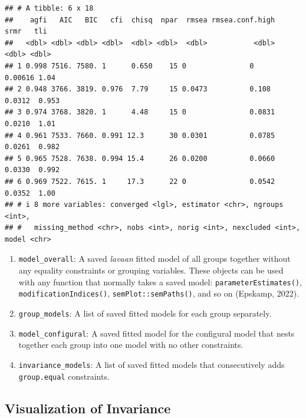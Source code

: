 \documentclass[
  man]{apa7}
\newenvironment{Shaded}{\begin{snugshade}}{\end{snugshade}}
\newcommand{\FunctionTok}[1]{\textcolor[rgb]{0.13,0.29,0.53}{\textbf{#1}}}
\newcommand{\NormalTok}[1]{#1}
\newcommand{\SpecialCharTok}[1]{\textcolor[rgb]{0.81,0.36,0.00}{\textbf{#1}}}
\providecommand{\tightlist}{%
  \setlength{\itemsep}{0pt}\setlength{\parskip}{0pt}}
\begin{document}
\small

\begin{Shaded}
\end{Shaded}

\normalsize

\begin{verbatim}
## # A tibble: 6 x 18
##    agfi   AIC   BIC   cfi  chisq  npar  rmsea rmsea.conf.high    srmr   tli
##   <dbl> <dbl> <dbl> <dbl>  <dbl> <dbl>  <dbl>           <dbl>   <dbl> <dbl>
## 1 0.998 7516. 7580. 1      0.650    15 0               0      0.00616 1.04 
## 2 0.948 3766. 3819. 0.976  7.79     15 0.0473          0.108  0.0312  0.953
## 3 0.974 3768. 3820. 1      4.48     15 0               0.0831 0.0210  1.01 
## 4 0.961 7533. 7660. 0.991 12.3      30 0.0301          0.0785 0.0261  0.982
## 5 0.965 7528. 7638. 0.994 15.4      26 0.0200          0.0660 0.0330  0.992
## 6 0.969 7522. 7615. 1     17.3      22 0               0.0542 0.0352  1.00 
## # i 8 more variables: converged <lgl>, estimator <chr>, ngroups <int>,
## #   missing_method <chr>, nobs <int>, norig <int>, nexcluded <int>, model <chr>
\end{verbatim}

\begin{enumerate}
\def\labelenumi{\arabic{enumi})}
\setcounter{enumi}{2}
\tightlist
\item
  \texttt{model\_overall}: A saved \emph{lavaan} fitted model of all groups together without any equality constraints or grouping variables. These objects can be used with any function that normally takes a saved model: \texttt{parameterEstimates()}, \texttt{modificationIndices()}, \texttt{semPlot::semPaths()}, and so on (Epskamp, 2022).
\item
  \texttt{group\_models}: A list of saved fitted models for each group separately.
\item
  \texttt{model\_configural}: A saved fitted model for the configural model that nests together each group into one model with no other constraints.
\item
  \texttt{invariance\_models}: A list of saved fitted models that consecutively adds \texttt{group.equal} constraints.
\end{enumerate}

\hypertarget{visualization-of-invariance}{%
\subsection{Visualization of Invariance}\label{visualization-of-invariance}}
\end{document}
